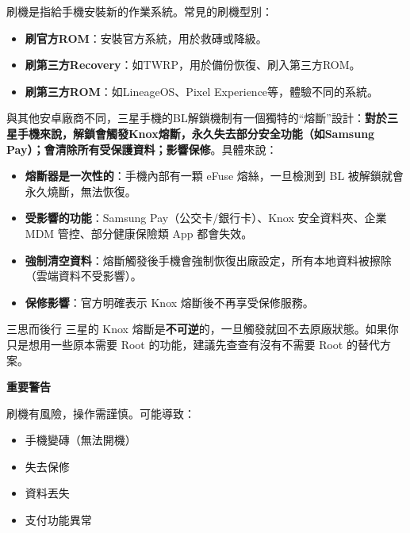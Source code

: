 
刷機是指給手機安裝新的作業系統。常見的刷機型別：

\begin{itemize}
  \item \textbf{刷官方ROM}：安裝官方系統，用於救磚或降級。
  \item \textbf{刷第三方Recovery}：如TWRP，用於備份恢復、刷入第三方ROM。
  \item \textbf{刷第三方ROM}：如LineageOS、Pixel Experience等，體驗不同的系統。
\end{itemize}


與其他安卓廠商不同，三星手機的BL解鎖機制有一個獨特的“熔斷”設計：\textbf{對於三星手機來說，解鎖會觸發Knox熔斷，永久失去部分安全功能（如Samsung Pay）；會清除所有受保護資料；影響保修}。具體來說：

\begin{itemize}
  \item \textbf{熔斷器是一次性的}：手機內部有一顆 eFuse 熔絲，一旦檢測到 BL 被解鎖就會永久燒斷，無法恢復。
  \item \textbf{受影響的功能}：Samsung Pay（公交卡/銀行卡）、Knox 安全資料夾、企業 MDM 管控、部分健康保險類 App 都會失效。
  \item \textbf{強制清空資料}：熔斷觸發後手機會強制恢復出廠設定，所有本地資料被擦除（雲端資料不受影響）。
  \item \textbf{保修影響}：官方明確表示 Knox 熔斷後不再享受保修服務。
\end{itemize}

\begin{tcbwarn}{三思而後行}
三星的 Knox 熔斷是\textbf{不可逆}的，一旦觸發就回不去原廠狀態。如果你只是想用一些原本需要 Root 的功能，建議先查查有沒有不需要 Root 的替代方案。

\end{tcbwarn}

\textbf{重要警告}\par

刷機有風險，操作需謹慎。可能導致：

\begin{itemize}
  \item 手機變磚（無法開機）
  \item 失去保修
  \item 資料丟失
  \item 支付功能異常
\end{itemize}

